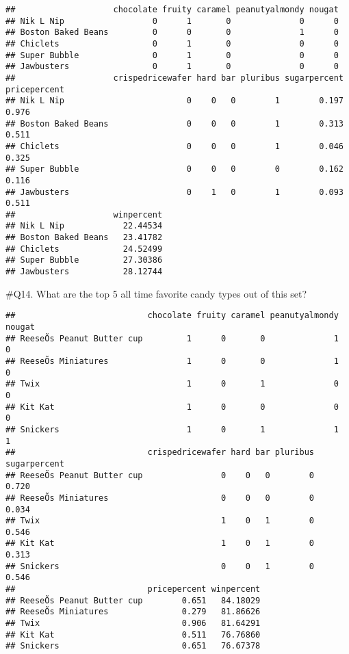 \documentclass[
]{article}
\newenvironment{Shaded}{\begin{snugshade}}{\end{snugshade}}
\newcommand{\DecValTok}[1]{\textcolor[rgb]{0.00,0.00,0.81}{#1}}
\newcommand{\KeywordTok}[1]{\textcolor[rgb]{0.13,0.29,0.53}{\textbf{#1}}}
\newcommand{\NormalTok}[1]{#1}
\newcommand{\OperatorTok}[1]{\textcolor[rgb]{0.81,0.36,0.00}{\textbf{#1}}}
\newcommand{\StringTok}[1]{\textcolor[rgb]{0.31,0.60,0.02}{#1}}
\begin{document}
\begin{verbatim}
##                    chocolate fruity caramel peanutyalmondy nougat
## Nik L Nip                  0      1       0              0      0
## Boston Baked Beans         0      0       0              1      0
## Chiclets                   0      1       0              0      0
## Super Bubble               0      1       0              0      0
## Jawbusters                 0      1       0              0      0
##                    crispedricewafer hard bar pluribus sugarpercent pricepercent
## Nik L Nip                         0    0   0        1        0.197        0.976
## Boston Baked Beans                0    0   0        1        0.313        0.511
## Chiclets                          0    0   0        1        0.046        0.325
## Super Bubble                      0    0   0        0        0.162        0.116
## Jawbusters                        0    1   0        1        0.093        0.511
##                    winpercent
## Nik L Nip            22.44534
## Boston Baked Beans   23.41782
## Chiclets             24.52499
## Super Bubble         27.30386
## Jawbusters           28.12744
\end{verbatim}

\#Q14. What are the top 5 all time favorite candy types out of this set?

\begin{Shaded}
\end{Shaded}

\begin{verbatim}
##                           chocolate fruity caramel peanutyalmondy nougat
## ReeseÕs Peanut Butter cup         1      0       0              1      0
## ReeseÕs Miniatures                1      0       0              1      0
## Twix                              1      0       1              0      0
## Kit Kat                           1      0       0              0      0
## Snickers                          1      0       1              1      1
##                           crispedricewafer hard bar pluribus sugarpercent
## ReeseÕs Peanut Butter cup                0    0   0        0        0.720
## ReeseÕs Miniatures                       0    0   0        0        0.034
## Twix                                     1    0   1        0        0.546
## Kit Kat                                  1    0   1        0        0.313
## Snickers                                 0    0   1        0        0.546
##                           pricepercent winpercent
## ReeseÕs Peanut Butter cup        0.651   84.18029
## ReeseÕs Miniatures               0.279   81.86626
## Twix                             0.906   81.64291
## Kit Kat                          0.511   76.76860
## Snickers                         0.651   76.67378
\end{verbatim}
\end{document}
